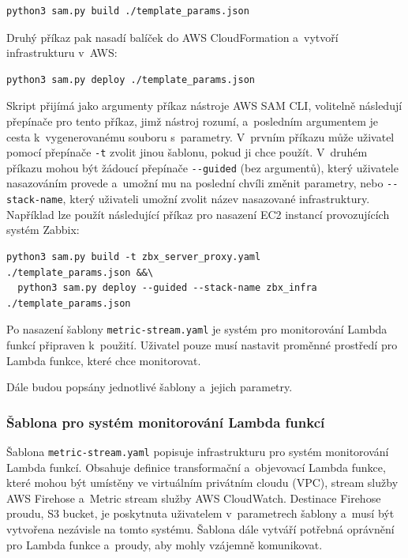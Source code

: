 \documentclass[czech, ing, kiv, he, iso690]{fasthesis}
\begin{document}
\begin{lstlisting}[breaklines=true]
  python3 sam.py build ./template_params.json
\end{lstlisting}

Druhý příkaz pak nasadí balíček do AWS CloudFormation a~vytvoří infrastrukturu v~AWS:

\begin{lstlisting}[breaklines=true]
  python3 sam.py deploy ./template_params.json
\end{lstlisting}

Skript přijímá jako argumenty příkaz nástroje AWS SAM CLI, volitelně následují přepínače pro tento příkaz, jimž nástroj rozumí, a~posledním argumentem je cesta k~vygenerovanému souboru s~parametry. V~prvním příkazu může uživatel pomocí přepínače \verb|-t| zvolit jinou šablonu, pokud ji chce použít. V~druhém příkazu mohou být žádoucí přepínače \verb|--guided| (bez argumentů), který uživatele nasazováním provede a~umožní mu na poslední chvíli změnit parametry, nebo \verb|--stack-name|, který uživateli umožní zvolit název nasazované infrastruktury. Například lze použít následující příkaz pro nasazení EC2 instancí provozujících systém Zabbix:

\begin{lstlisting}[breaklines=true]
  python3 sam.py build -t zbx_server_proxy.yaml      ./template_params.json &&\
  python3 sam.py deploy --guided --stack-name zbx_infra ./template_params.json
\end{lstlisting}

Po nasazení šablony \verb|metric-stream.yaml| je systém pro monitorování Lambda funkcí připraven k~použití. Uživatel pouze musí nastavit proměnné prostředí pro Lambda funkce, které chce monitorovat. 

Dále budou popsány jednotlivé šablony a~jejich parametry.

\subsubsection{Šablona pro systém monitorování Lambda funkcí}

Šablona \verb|metric-stream.yaml| popisuje infrastrukturu pro systém monitorování Lambda funkcí. Obsahuje definice transformační a~objevovací Lambda funkce, které mohou být umístěny ve virtuálním privátním cloudu (VPC), stream služby AWS Firehose a~Metric stream služby AWS CloudWatch. Destinace Firehose proudu, S3 bucket, je poskytnuta uživatelem v~parametrech šablony a~musí být vytvořena nezávisle na tomto systému. Šablona dále vytváří potřebná oprávnění pro Lambda funkce a~proudy, aby mohly vzájemně komunikovat. 
\end{document}
